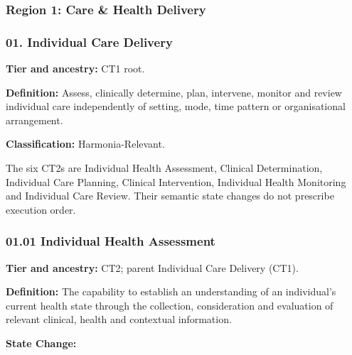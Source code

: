\par\smallskip
{}\label{rad:business:146}
\subsubsection*{Region 1: Care \& Health Delivery}
\label{rad:business:148}
\subsubsection*{01. Individual Care Delivery}
\label{rad:business:150}

\textbf{Tier and ancestry:} CT1 root.

\label{rad:business:152}

\textbf{Definition:} Assess, clinically determine, plan, intervene, monitor and review individual care independently of setting, mode, time pattern or organisational arrangement.

\label{rad:business:154}

\textbf{Classification:} Harmonia-Relevant.

\label{rad:business:156}

The six CT2s are Individual Health Assessment, Clinical Determination, Individual Care Planning, Clinical Intervention, Individual Health Monitoring and Individual Care Review. Their semantic state changes do not prescribe execution order.

\label{rad:business:158}



\label{rad:business:160}
\subsubsection*{01.01 Individual Health Assessment}
\label{rad:business:162}

\textbf{Tier and ancestry:} CT2; parent Individual Care Delivery (CT1).

\label{rad:business:164}

\textbf{Definition:} The capability to establish an understanding of an individual's current health state through the collection, consideration and evaluation of relevant clinical, health and contextual information.

\label{rad:business:168}

\textbf{State Change:} \texttt{}

